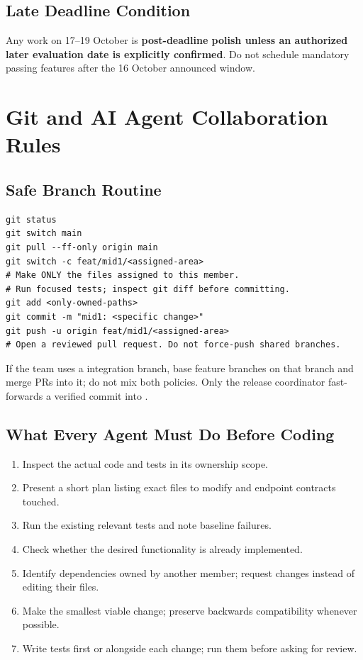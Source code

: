 \documentclass[11pt,a4paper,oneside]{report}
\newcommand{\file}[1]{\path{#1}}
\begin{document}
\section{Late Deadline Condition}
Any work on 17--19 October is \textbf{post-deadline polish unless an authorized later evaluation date is explicitly confirmed}. Do not schedule mandatory passing features after the 16 October announced window.

\chapter{Git and AI Agent Collaboration Rules}
\section{Safe Branch Routine}
\begin{lstlisting}
git status
git switch main
git pull --ff-only origin main
git switch -c feat/mid1/<assigned-area>
# Make ONLY the files assigned to this member.
# Run focused tests; inspect git diff before committing.
git add <only-owned-paths>
git commit -m "mid1: <specific change>"
git push -u origin feat/mid1/<assigned-area>
# Open a reviewed pull request. Do not force-push shared branches.
\end{lstlisting}
If the team uses a \file{develop} integration branch, base feature branches on that branch and merge PRs into it; do not mix both policies. Only the release coordinator fast-forwards a verified commit into \file{main}.

\section{What Every Agent Must Do Before Coding}
\begin{enumerate}
\item Inspect the actual code and tests in its ownership scope.
\item Present a short plan listing exact files to modify and endpoint contracts touched.
\item Run the existing relevant tests and note baseline failures.
\item Check whether the desired functionality is already implemented.
\item Identify dependencies owned by another member; request changes instead of editing their files.
\item Make the smallest viable change; preserve backwards compatibility whenever possible.
\item Write tests first or alongside each change; run them before asking for review.
\end{enumerate}
\end{document}
